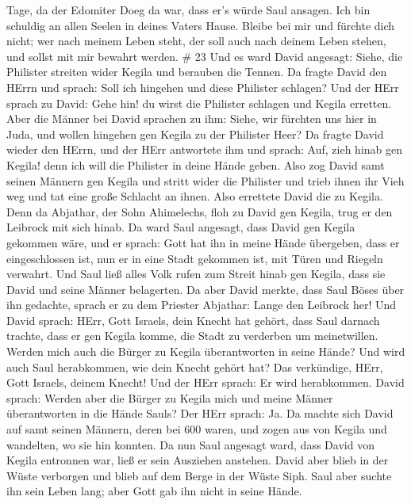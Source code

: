 Tage, da der Edomiter Doeg da war, dass er's würde Saul ansagen. Ich bin
schuldig an allen Seelen in deines Vaters Hause.  Bleibe
bei mir und fürchte dich nicht; wer nach meinem Leben steht, der soll
auch nach deinem Leben stehen, und sollst mit mir bewahrt werden. \# 23
 Und es ward David angesagt: Siehe, die Philister streiten
wider Kegila und berauben die Tennen.  Da fragte David den
HErrn und sprach: Soll ich hingehen und diese Philister schlagen? Und
der HErr sprach zu David: Gehe hin! du wirst die Philister schlagen und
Kegila erretten.  Aber die Männer bei David sprachen zu ihm:
Siehe, wir fürchten uns hier in Juda, und wollen hingehen gen Kegila zu
der Philister Heer?  Da fragte David wieder den HErrn, und
der HErr antwortete ihm und sprach: Auf, zieh hinab gen Kegila! denn ich
will die Philister in deine Hände geben.  Also zog David
samt seinen Männern gen Kegila und stritt wider die Philister und trieb
ihnen ihr Vieh weg und tat eine große Schlacht an ihnen. Also errettete
David die zu Kegila.  Denn da Abjathar, der Sohn Ahimelechs,
floh zu David gen Kegila, trug er den Leibrock mit sich hinab.
 Da ward Saul angesagt, dass David gen Kegila gekommen wäre,
und er sprach: Gott hat ihn in meine Hände übergeben, dass er
eingeschlossen ist, nun er in eine Stadt gekommen ist, mit Türen und
Riegeln verwahrt.  Und Saul ließ alles Volk rufen zum Streit
hinab gen Kegila, dass sie David und seine Männer belagerten.
 Da aber David merkte, dass Saul Böses über ihn gedachte,
sprach er zu dem Priester Abjathar: Lange den Leibrock her!
 Und David sprach: HErr, Gott Israels, dein Knecht hat
gehört, dass Saul darnach trachte, dass er gen Kegila komme, die Stadt
zu verderben um meinetwillen.  Werden mich auch die Bürger
zu Kegila überantworten in seine Hände? Und wird auch Saul herabkommen,
wie dein Knecht gehört hat? Das verkündige, HErr, Gott Israels, deinem
Knecht! Und der HErr sprach: Er wird herabkommen.  David
sprach: Werden aber die Bürger zu Kegila mich und meine Männer
überantworten in die Hände Sauls? Der HErr sprach: Ja.  Da
machte sich David auf samt seinen Männern, deren bei 600 waren, und
zogen aus von Kegila und wandelten, wo sie hin konnten. Da nun Saul
angesagt ward, dass David von Kegila entronnen war, ließ er sein
Ausziehen anstehen.  David aber blieb in der Wüste
verborgen und blieb auf dem Berge in der Wüste Siph. Saul aber suchte
ihn sein Leben lang; aber Gott gab ihn nicht in seine Hände.
